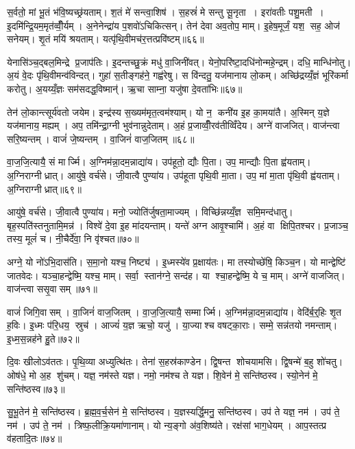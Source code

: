 स॒र्वतो॒ मां भू॒तं भ॑वि॒ष्यच्छ्र॑यताम्। श॒तं मे॑ सन्त्वा॒शिष॑। स॒हस्रं॑ मे सन्तु सू॒नृता। इरा॑वतीः पशु॒मती। इ॒दमि॑न्द्रि॒यम॒मृत॑व्वीँ॒र्यम्। अ॒नेनेन्द्रा॑य प॒शवो॑ऽचिकित्सन्। तेन॑ देवा अव॒तोप॒ माम्। इ॒हेष॒मूर्जं॒ यश॒ सह॒ ओज॑ सनेयम्। शृ॒तं मयि॑ श्रयताम्। यत्पृ॑थि॒वीमच॑र॒त्तत्प्रवि॑ष्टम्॥६६॥

येनासि॑ञ्च॒द्बल॒मिन्द्रे प्र॒जाप॑तिः। इ॒दन्तच्छु॒क्रं मधु॑ वा॒जिनी॑वत्। येनो॒परि॑ष्टा॒दधि॑नोन्महे॒न्द्रम्। दधि॒ मान्धि॑नोतु। अ॒यं वे॒दः पृ॑थि॒वीमन्व॑विन्दत्। गुहा॑ स॒तीङ्गह॑ने॒ गह्व॑रेषु। स वि॑न्दतु॒ यज॑मानाय लो॒कम्। अच्छि॑द्रय्यँ॒ज्ञं भूरि॑कर्मा करोतु। अ॒यय्यँ॒ज्ञः सम॑सदद्ध॒विष्मान्॑। ऋ॒चा साम्ना॒ यजु॑षा दे॒वता॑भिः॥६७॥

तेन॑ लो॒कान्त्सूर्य॑वतो जयेम। इन्द्र॑स्य स॒ख्यम॑मृत॒त्वम॑श्याम्। यो न॒ कनी॑य इ॒ह का॒मया॑तै। अ॒स्मिन् य॒ज्ञे यज॑मानाय॒ मह्यम्। अप॒ तमि॑न्द्रा॒ग्नी भुव॑नान्नुदेताम्। अ॒हं प्र॒जाव्वीँ॒रव॑तीव्विँदेय। अग्ने॑ वाजजित्। वाज॑न्त्वा सरि॒ष्यन्तम्। वाजं॑ जे॒ष्यन्तम्। वा॒जिनं॑ वाज॒जितम्॥६८॥

वा॒ज॒जि॒त्यायै॒ सं मार्ज्मि। अ॒ग्निम॑न्ना॒दम॒न्नाद्या॑य। उप॑हूतो॒ द्यौः पि॒ता। उप॒ मान्द्यौः पि॒ता ह्व॑यताम्। अ॒ग्निराग्नीध्रात्। आयु॑षे॒ वर्च॑से। जी॒वात्वै पुण्या॑य। उप॑हूता पृथि॒वी मा॒ता। उप॒ मां मा॒ता पृ॑थि॒वी ह्व॑यताम्। अ॒ग्निराग्नीध्रात्॥६९॥

आयु॑षे॒ वर्च॑से। जी॒वात्वै पुण्या॑य। मनो॒ ज्योति॑र्जुषता॒माज्यम्। विच्छि॑न्नय्यँ॒ज्ञ समि॒मन्द॑धातु। बृह॒स्पति॑स्तनुतामि॒मन्न॑। विश्वे॑ दे॒वा इ॒ह मा॑दयन्ताम्। यन्ते॑ अग्न आवृ॒श्चामि॑। अ॒हं वा क्षिपि॒तश्चर\sn{}। प्र॒जाञ्च॒ तस्य॒ मूलं॑ च। नी॒चैर्दे॑वा॒ नि वृ॑श्चत॥७०॥

अग्ने॒ यो नो॑ऽभि॒दास॑ति। स॒मा॒नो यश्च॒ निष्ट्य॑। इ॒ध्मस्ये॑व प्र॒क्षाय॑तः। मा तस्योच्छे॑षि॒ किञ्च॒न। यो मान्द्वेष्टि॑ जातवेदः। यञ्चा॒हन्द्वेष्मि॒ यश्च॒ माम्। सर्वा॒ स्तान॑ग्ने॒ सन्द॑ह। या श्चा॒हन्द्वेष्मि॒ ये च॒ माम्। अग्ने॑ वाजजित्। वाज॑न्त्वा ससृ॒वासम्॥७१॥

वाजं॑ जिगि॒वासम्। वा॒जिनं॑ वाज॒जितम्। वा॒ज॒जि॒त्यायै॒ सम्मार्ज्मि। अ॒ग्निम॑न्ना॒दम॒न्नाद्या॑य। वेदि॑र्ब॒र्॒हिः शृ॒त ह॒विः। इ॒ध्मः प॑रि॒धय॒ स्रुच॑। आज्यं॑ य॒ज्ञ ऋचो॒ यजु॑। या॒ज्याश्च वषट्का॒राः। सम्मे॒ सन्न॑तयो नमन्ताम्। इ॒ध्म॒स॒न्नह॑ने हु॒ते॥७२॥

दि॒वः खीलोऽव॑ततः। पृ॒थि॒व्या अध्युत्थि॑तः। तेना॑ स॒हस्र॑काण्डेन। द्वि॒षन्त शोचयामसि। द्वि॒षन्मे॑ ब॒हु शो॑चतु। ओष॑धे॒ मो अ॒ह शु॑चम्। यज्ञ॒ नम॑स्ते यज्ञ। नमो॒ नम॑श्च ते यज्ञ। शि॒वेन॑ मे॒ सन्ति॑ष्ठस्व। स्यो॒नेन॑ मे॒ सन्ति॑ष्ठस्व॥७३॥

सु॒भू॒तेन॑ मे॒ सन्ति॑ष्ठस्व। ब्र॒ह्म॒व॒र्च॒सेन॑ मे॒ सन्ति॑ष्ठस्व। य॒ज्ञस्यर्द्धि॒मनु॒ सन्ति॑ष्ठस्व। उप॑ ते यज्ञ॒ नम॑। उप॑ ते॒ नम॑। उप॑ ते॒ नम॑। त्रिष्फ॒लीक्रि॒यमा॑णानाम्। यो न्य॒ङ्गो अ॑व॒शिष्य॑ते। रक्ष॑सां भाग॒धेयम्। आप॒स्तत्प्र व॑हतादि॒तः॥७४॥

